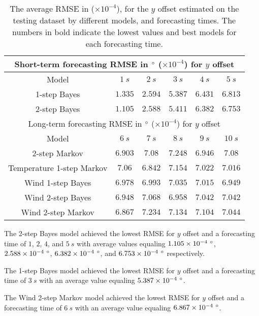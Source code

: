 \documentclass[preprint,12pt]{elsarticle}
\begin{document}
\begin{table}[!ht]
	\centering
	\begin{tabular}{|c|c|c|c|c|c|}
		\hline
		\multicolumn{6}{|c|}{Short-term forecasting RMSE in $\degree$ ($\times 10^{-4}$) for $y$ offset} \\ \hline
		Model & $1 \ s$ & $2 \ s$ & $3 \ s$ & $4 \ s$ & $5 \ s$ \\ \hline
		1-step Bayes & $1.335$ & $2.594$ & $\mathbf{5.387}$ & $6.431$ & $6.813$ \\ \hline
		2-step Bayes & $\mathbf{1.105}$ & $\mathbf{2.588}$ & $5.411$ & $\mathbf{6.382}$ & $\mathbf{6.753}$ \\ \hline
		\multicolumn{6}{|c|}{Long-term forecasting RMSE in $\degree$ ($\times 10^{-4}$) for $y$ offset} \\ \hline
		Model & $6 \ s$ & $7 \ s$ & $8 \ s$ & $9 \ s$ & $10 \ s$ \\ \hline
		2-step Markov & $6.903$ & $7.08$ & $7.248$ & $\mathbf{6.946}$ & $7.08$ \\ \hline
		Temperature 1-step Markov & $7.06$ & $\mathbf{6.842}$ & $7.154$ & $7.022$ & $7.016$ \\ \hline
		Wind 1-step Bayes & $6.978$ & $6.993$ & $7.035$ & $7.015$ & $\mathbf{6.949}$ \\ \hline
		Wind 2-step Bayes & $6.948$ & $7.068$ & $\mathbf{6.958}$ & $7.042$ & $7.042$ \\ \hline
		Wind 2-step Markov & $\mathbf{6.867}$ & $7.234$ & $7.134$ & $7.104$ & $7.044$ \\ \hline
	\end{tabular}
	\caption{The average RMSE in \degree ($\times 10^{-4}$), for the $y$ offset estimated on the testing dataset by different models, and forecasting times. The numbers in bold indicate the lowest values and best models for each forecasting time.}
	\label{tab:best_latitude_RMSE}
\end{table}

The 2-step Bayes model achieved the lowest RMSE for $y$ offset and a forecasting time of $1$, $2$, $4$, and $5 \ s$ with average values equaling $1.105 \times 10^{-4} \ \degree$, $2.588 \times 10^{-4} \ \degree$, $6.382 \times 10^{-4} \ \degree$, and $6.753 \times 10^{-4} \ \degree$ respectively.

The 1-step Bayes model achieved the lowest RMSE for $y$ offset and a forecasting time of $3 \ s$ with an average value equaling $5.387 \times 10^{-4} \ \degree$.

The Wind 2-step Markov model achieved the lowest RMSE for $y$ offset and a forecasting time of $6 \ s$ with an average value equaling $6.867 \times 10^{-4} \ \degree$.
\end{document}
